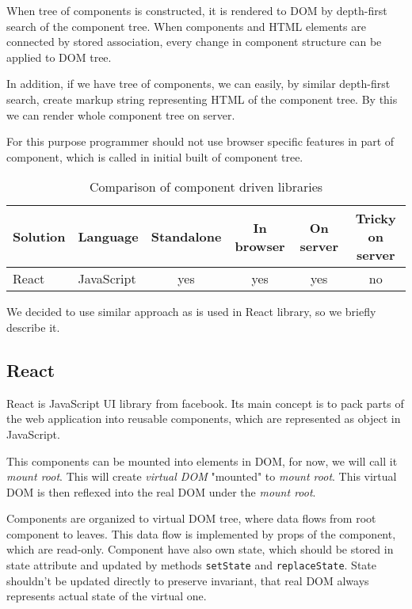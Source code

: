 \documentclass[oneside, 12pt]{book}
\begin{document}
	When tree of components is constructed, it is rendered to DOM by depth-first search of the component tree.
	When components and HTML elements are connected by stored association, 
	every change in component structure can be applied to DOM tree. 

	In addition, if we have tree of components, we can easily, by similar depth-first search, 
	create markup string representing HTML of the component tree.
	By this we can render whole component tree on server.

	For this purpose programmer should not use browser specific features in part of component, 
	which is called in initial built of component tree.

	\begin{table}
		\begin{tabular}{|l|l|c|c|c|c|}
			\hline
			\textbf{Solution}& \textbf{Language}   & \textbf{Standalone} & \textbf{In browser} & \textbf{On server} & \textbf{Tricky on server}\\
			\hline
			React            & JavaScript          &         yes         &        yes          &        yes         &           no             \\
			\hline
		\end{tabular}
		\caption{Comparison of component driven libraries}
		\label{table:component-driven-libraries}
	\end{table}

	We decided to use similar approach as is used in React library, so we briefly describe it.

	\subsection{React}\label{subsec:existing-component-react}
		
		React is JavaScript UI library from facebook. 
		Its main concept is to pack parts of the web application into reusable components, 
		which are represented as object in JavaScript. 

		This components can be mounted into elements in DOM, for now, we will call it \textit{mount root}. 
		This will create \textit{virtual DOM} "mounted" to \textit{mount root}. 
		This virtual DOM is then reflexed into the real DOM under the \textit{mount root}.

		Components are organized to virtual DOM tree, where data flows from root component to leaves. 
		This data flow is implemented by props of the component, which are read-only.
		Component have also own state, which should be stored in state attribute and updated by methods \texttt{setState} and \texttt{replaceState}. 
		State shouldn't be updated directly to preserve invariant, that real DOM always represents actual state of the virtual one. 
\end{document}
